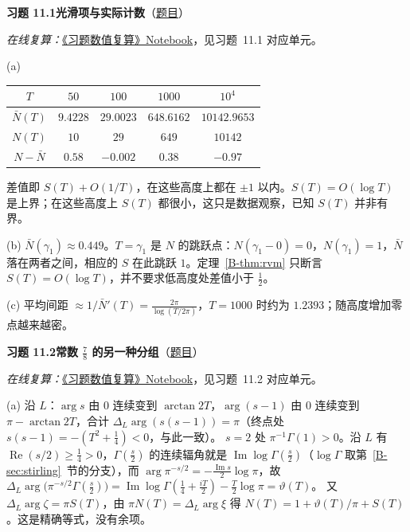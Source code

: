\documentclass[11pt,a4paper]{article}
\renewcommand{\Re}{\operatorname{Re}}
\renewcommand{\Im}{\operatorname{Im}}
\newcommand{\bref}[1]{\ref*{B-#1}}
\newcommand{\Sol}[2]{%
  \par\addvspace{1.2em}\noindent
  \hypertarget{s:#1}{}\textbf{习题 #1\quad #2}\hfill{\small（\hyperlink{q:#1}{题目}）}\par
  \nopagebreak\smallskip}
\begin{document}
\Sol{11.1}{光滑项与实际计数}
\emph{在线复算：}\href{https://colab.research.google.com/github/lichengtong123/lichengtong-RH/blob/main/\%E4\%B9\%A0\%E9\%A2\%98\%E4\%B8\%8E\%E8\%A7\%A3\%E7\%AD\%94/\%E4\%B9\%A0\%E9\%A2\%98\%E6\%95\%B0\%E5\%80\%BC\%E5\%A4\%8D\%E7\%AE\%97.ipynb}{《习题数值复算》Notebook}，见习题~11.1 对应单元。

(a)
\begin{center}
\small
\begin{tabular}{@{}ccccc@{}}
\toprule
$T$ & $50$ & $100$ & $1000$ & $10^4$ \\
\midrule
$\bar N(T)$ & $9.4228$ & $29.0023$ & $648.6162$ & $10142.9653$ \\
$N(T)$ & $10$ & $29$ & $649$ & $10142$ \\
$N-\bar N$ & $0.58$ & $-0.002$ & $0.38$ & $-0.97$ \\
\bottomrule
\end{tabular}
\end{center}
差值即 $S(T)+O(1/T)$，在这些高度上都在 $\pm1$ 以内。$S(T)=O(\log T)$ 是上界；在这些高度上 $S(T)$ 都很小，这只是数据观察，已知 $S(T)$ 并非有界。

(b) $\bar N(\gamma_1)\approx0.449$。$T=\gamma_1$ 是 $N$ 的跳跃点：$N(\gamma_1-0)=0$，$N(\gamma_1)=1$，$\bar N$ 落在两者之间，相应的 $S$ 在此跳跃 $1$。定理~\bref{thm:rvm} 只断言 $S(T)=O(\log T)$，并不要求低高度处差值小于 $\frac12$。

(c) 平均间距 $\approx1/\bar N'(T)=\frac{2\pi}{\log(T/2\pi)}$，$T=1000$ 时约为 $1.2393$；随高度增加零点越来越密。

\Sol{11.2}{常数 $\tfrac78$ 的另一种分组}
\emph{在线复算：}\href{https://colab.research.google.com/github/lichengtong123/lichengtong-RH/blob/main/\%E4\%B9\%A0\%E9\%A2\%98\%E4\%B8\%8E\%E8\%A7\%A3\%E7\%AD\%94/\%E4\%B9\%A0\%E9\%A2\%98\%E6\%95\%B0\%E5\%80\%BC\%E5\%A4\%8D\%E7\%AE\%97.ipynb}{《习题数值复算》Notebook}，见习题~11.2 对应单元。

(a) 沿 $L$：$\arg s$ 由 $0$ 连续变到 $\arctan2T$，$\arg(s-1)$ 由 $0$ 连续变到 $\pi-\arctan2T$，合计 $\Delta_L\arg(s(s-1))=\pi$（终点处 $s(s-1)=-(T^2+\frac14)<0$，与此一致）。
$s=2$ 处 $\pi^{-1}\Gamma(1)>0$。沿 $L$ 有 $\Re(s/2)\ge\frac14>0$，$\Gamma(\frac s2)$ 的连续辐角就是 $\Im\log\Gamma(\frac s2)$（$\log\Gamma$ 取第~\bref{sec:stirling}~节的分支），而 $\arg\pi^{-s/2}=-\frac{\Im s}2\log\pi$，故
$\Delta_L\arg\bigl(\pi^{-s/2}\Gamma(\frac s2)\bigr)=\Im\log\Gamma(\frac14+\frac{iT}2)-\frac T2\log\pi=\vartheta(T)$。
又 $\Delta_L\arg\zeta=\pi S(T)$，由 $\pi N(T)=\Delta_L\arg\xi$ 得 $N(T)=1+\vartheta(T)/\pi+S(T)$。这是精确等式，没有余项。
\end{document}
